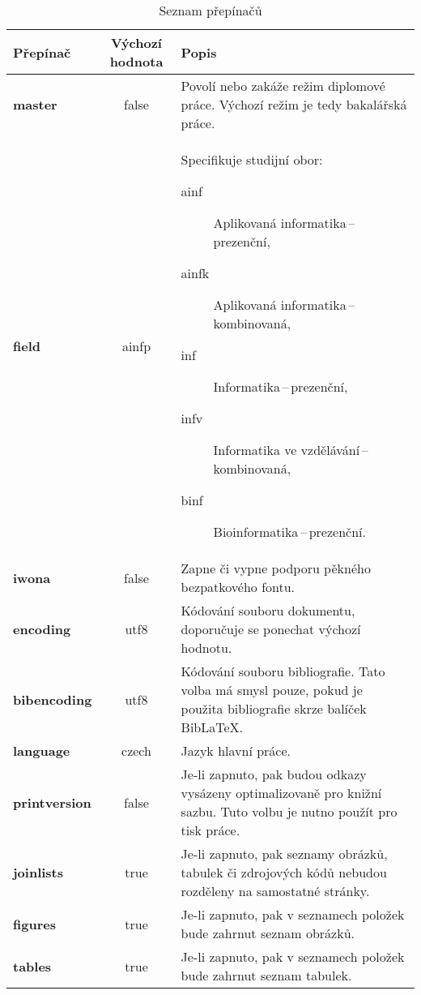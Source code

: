 \documentclass[
  master=false                %
  font=sans,                  %
  printversion=false,         %
  joinlists=true,             %
  glossaries=true,            %
  figures=true,               %
  tables=true,                %
  sourcecodes=true,					  %
  theorems=true,						  %
  bibencoding=utf8,           %
  language=czech,             %
  encoding=utf8,              %
  field=inf,                  %
  index=true,                 %
]{updiplom}
\begin{document}
\begin{table}
\begin{center}
\caption{Seznam přepínačů}\label{tab:prepinace}
\begin{tabular}{>{\bfseries}l >{\ttfamily}c L{8cm}}
{\normalfont Přepínač} & {\normalfont Výchozí hodnota} & {\normalfont Popis} \\
\hline
master & false & Povolí nebo zakáže režim diplomové práce. Výchozí režim je tedy bakalářská práce. \\

field & ainfp & Specifikuje studijní obor:\newline
\begin{description}
\item[ainf] Aplikovaná informatika\,--\,prezenční,
\item[ainfk] Aplikovaná informatika\,--\,kombinovaná,
\item[inf] Informatika\,--\,prezenční,
\item[infv] Informatika ve vzdělávání\,--\,kombinovaná,
\item[binf] Bioinformatika\,--\,prezenční.
\end{description} \\

iwona & false & Zapne či vypne podporu pěkného bezpatkového fontu. \\

encoding & utf8 & Kódování souboru dokumentu, doporučuje se ponechat výchozí hodnotu. \\

bibencoding & utf8 & Kódování souboru bibliografie. Tato volba má smysl pouze, pokud je použita bibliografie skrze balíček Bib\LaTeX{}. \\

language & czech & Jazyk hlavní práce. \\

printversion & false & Je-li zapnuto, pak budou odkazy vysázeny optimalizovaně pro knižní sazbu. Tuto volbu je nutno použít pro tisk práce. \\

joinlists & true & Je-li zapnuto, pak seznamy obrázků, tabulek či zdrojových kódů nebudou rozděleny na samostatné stránky. \\

figures & true & Je-li zapnuto, pak v seznamech položek bude zahrnut seznam obrázků. \\

tables & true & Je-li zapnuto, pak v seznamech položek bude zahrnut seznam tabulek. \\


\end{tabular}
\end{center}
\end{table}
\end{document}
